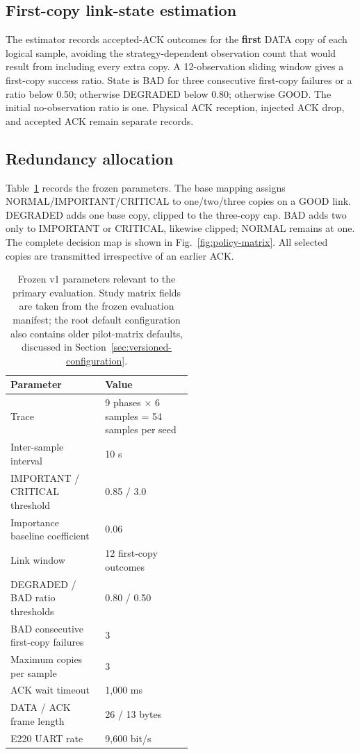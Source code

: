 \documentclass[11pt]{article}
\begin{document}
\subsection{First-copy link-state estimation}\label{sec:first-copy-link-state-estimation}

The estimator records accepted-ACK outcomes for the \textbf{first} DATA copy of each logical sample, avoiding the strategy-dependent observation count that would result from including every extra copy. A 12-observation sliding window gives a first-copy success ratio. State is BAD for three consecutive first-copy failures or a ratio below 0.50; otherwise DEGRADED below 0.80; otherwise GOOD. The initial no-observation ratio is one. Physical ACK reception, injected ACK drop, and accepted ACK remain separate records.

\subsection{Redundancy allocation}\label{sec:redundancy-allocation}

Table~\ref{tab:parameters} records the frozen parameters. The base mapping assigns NORMAL/IMPORTANT/CRITICAL to one/two/three copies on a GOOD link. DEGRADED adds one base copy, clipped to the three-copy cap. BAD adds two only to IMPORTANT or CRITICAL, likewise clipped; NORMAL remains at one. The complete decision map is shown in Fig.~\ref{fig:policy-matrix}. All selected copies are transmitted irrespective of an earlier ACK.

\begin{table}[t]
\centering
\small
\caption{Frozen v1 parameters relevant to the primary evaluation. Study matrix fields are taken from the frozen evaluation manifest; the root default configuration also contains older pilot-matrix defaults, discussed in Section~\ref{sec:versioned-configuration}.}
\label{tab:parameters}
\begin{tabularx}{\linewidth}{@{}p{0.52\linewidth}X@{}}
\toprule
Parameter & Value \\
\midrule
Trace & 9 phases \ensuremath{\times} 6 samples = 54 samples per seed \\
Inter-sample interval & 10 s \\
IMPORTANT / CRITICAL threshold & 0.85 / 3.0 \\
Importance baseline coefficient & 0.06 \\
Link window & 12 first-copy outcomes \\
DEGRADED / BAD ratio thresholds & 0.80 / 0.50 \\
BAD consecutive first-copy failures & 3 \\
Maximum copies per sample & 3 \\
ACK wait timeout & 1,000 ms \\
DATA / ACK frame length & 26 / 13 bytes \\
E220 UART rate & 9,600 bit/s \\
\bottomrule
\end{tabularx}
\end{table}
\end{document}
